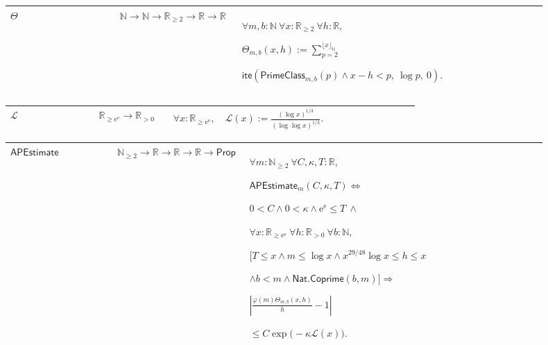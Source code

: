 \documentclass[12pt,reqno]{amsart}
\newcommand{\N}{\mathbb N}
\newcommand{\R}{\mathbb R}
\theoremstyle{blueplain}
\numberwithin{equation}{section}
\def\hyperlink#1#2{#2}}
\begin{document}
\par\setlength{\parskip}{0pt}\nointerlineskip
\noindent
\begin{tabular}{|@{}p{0.19251\linewidth}|p{0.16845\linewidth}|p{0.53904\linewidth}|}\hline
{\hypertarget{def:Theta}{\(\Theta\)}} & {\(\N\to\N\to\R_{\ge2}\to\R\to\R\)} & {\(\displaystyle \forall m,b:\N\ \forall x:\R_{\ge2}\ \forall h:\R,\)
\par
\(\displaystyle \Theta_{m,b}(x,h):=\sum_{p=2}^{\lfloor x\rfloor_{\N}}\)
\par
\(\displaystyle \textsf{ite}(\hyperlink{def:PrimeClass}{\ensuremath{\textsf{PrimeClass}}}_{m,b}(p)\wedge x-h<p,\ \log p,\ 0).\)}\\
\hline
\end{tabular}
\par\setlength{\parskip}{0pt}\nointerlineskip
\noindent
\begin{tabular}{|@{}p{0.19251\linewidth}|p{0.16845\linewidth}|p{0.53904\linewidth}|}\hline
{\hypertarget{def:LogScale}{\(\mathcal L\)}} & {\(\R_{\ge\mathrm e^{\mathrm e}}\to\R_{>0}\)} & {\(\displaystyle \forall x:\R_{\ge\mathrm e^{\mathrm e}},\quad\mathcal L(x):=\frac{(\log x)^{1/3}}{(\log\log x)^{1/3}}.\)}\\
\hline
\end{tabular}
\par\setlength{\parskip}{0pt}\nointerlineskip
\noindent
\begin{tabular}{|@{}p{0.19251\linewidth}|p{0.16845\linewidth}|p{0.53904\linewidth}|}\hline
{\hypertarget{def:APEstimate}{\(\textsf{APEstimate}\)}} & {\(\N_{\ge2}\to\R\to\R\to\R\to\textsf{Prop}\)} & {\(\displaystyle \forall m:\N_{\ge2}\ \forall C,\kappa,T:\R,\)
\par
\(\displaystyle \hyperlink{def:APEstimate}{\ensuremath{\textsf{APEstimate}}}_m(C,\kappa,T)\Longleftrightarrow\)
\par
\(\displaystyle 0<C\wedge0<\kappa\wedge\mathrm e^{\mathrm e}\le T\ \wedge\)
\par
\(\displaystyle \forall x:\R_{\ge\mathrm e^{\mathrm e}}\ \forall h:\R_{>0}\ \forall b:\N,\)
\par
\(\displaystyle \bigl[T\le x\wedge m\le\log x\wedge x^{29/48}\log x\le h\le x\)
\par
\(\displaystyle \wedge b<m\wedge \hyperlink{def:Nat.Coprime}{\ensuremath{\textsf{Nat.Coprime}}}(b,m)\bigr]\Rightarrow\)
\par
\(\displaystyle \left|\frac{\hyperlink{def:Totient}{\varphi(m)}\hyperlink{def:Theta}{\Theta_{m,b}(x,h)}}h-1\right|\)
\par
\(\displaystyle \le C\exp\bigl(-\kappa \hyperlink{def:LogScale}{\mathcal L(x)}\bigr).\)}\\
\hline
\end{tabular}
\par
\endgroup
\end{document}
